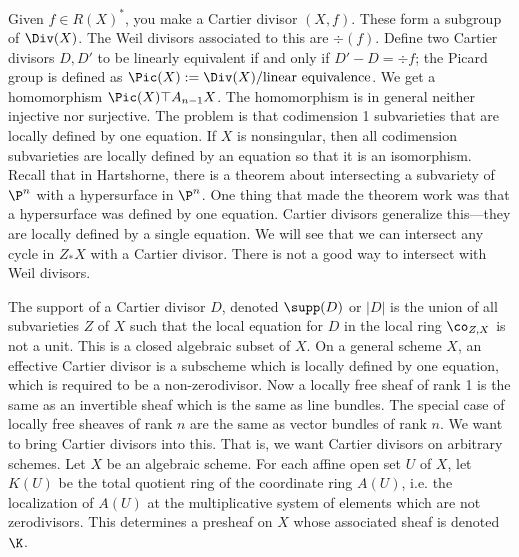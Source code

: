 Given $f \in R(X)^*$, you make a Cartier divisor $(X,f)$. These form a subgroup of $\Div(X)$. The Weil divisors associated to this are $\div(f)$. Define two Cartier divisors $D,D'$ to be linearly equivalent if and only if $D' - D=\div f$; the Picard group is defined as $\Pic(X):= \Div(X)/\text{linear equivalence}$. We get a homomorphism $\Pic(X) \top A_{n-1} X$. The homomorphism is in general neither injective nor surjective. The problem is that codimension 1 subvarieties that are locally defined by one equation. 
If $X$ is nonsingular, then all codimension subvarieties are locally defined by an equation so that it is an isomorphism. Recall that in Hartshorne, there is a theorem about intersecting a subvariety of $\P^n$ with a hypersurface in $\P^n$. One thing that made the theorem work was that a hypersurface was defined by one equation. Cartier divisors generalize this---they are locally defined by a single equation. We will see that we can intersect any cycle in $Z_*X$ with a Cartier divisor. There is not a good way to intersect with Weil divisors. 


The support of a Cartier divisor $D$, denoted $\supp(D)$ or $|D|$ is the union of all subvarieties $Z$ of $X$ such that the local equation for $D$ in the local ring $\co_{Z,X}$ is not a unit. This is a closed algebraic subset of $X$. On a general scheme $X$, an effective Cartier divisor is a subscheme which is locally defined by one equation, which is required to be a non-zerodivisor. Now a locally free sheaf of rank 1 is the same as an invertible sheaf which is the same as line bundles. The special case of locally free sheaves of rank $n$ are the same as vector bundles of rank $n$. We want to bring Cartier divisors into this. That is, we want Cartier divisors on arbitrary schemes. Let $X$ be an algebraic scheme. For each affine open set $U$ of $X$, let $K(U)$ be the total quotient ring of the coordinate ring $A(U)$, i.e. the localization of $A(U)$ at the multiplicative system of elements which are not zerodivisors. This determines a presheaf on $X$ whose associated sheaf is denoted $\K$.


